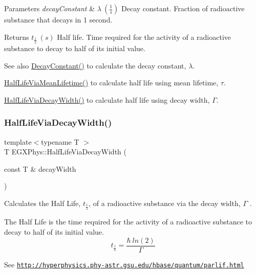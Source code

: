 \begin{DoxyParams}{Parameters}
{\em decay\+Constant} & $\lambda\ (\frac{1}{s})$ Decay constant. Fraction of radioactive substance that decays in 1 second. \\
\hline
\end{DoxyParams}
\begin{DoxyReturn}{Returns}
$t_{\frac{1}{2}}\ (s)$ Half life. Time required for the activity of a radioactive substance to decay to half of its initial value. 
\end{DoxyReturn}
\begin{DoxySeeAlso}{See also}
\hyperlink{group___atomic_ga904edce5aad441b4a0873b3b1a83c7f2}{Decay\+Constant()} to calculate the decay constant, $\lambda$. 

\hyperlink{group___half_life_gacddef16b62e98b214ec8dd8af7da7dce}{Half\+Life\+Via\+Mean\+Lifetime()} to calculate half life using mean lifetime, $\tau$. 

\hyperlink{group___half_life_gaba3fda944d1a68ee1016a1f2f5809359}{Half\+Life\+Via\+Decay\+Width()} to calculate half life using decay width, $\Gamma$. 
\end{DoxySeeAlso}
\mbox{\label{group___half_life_gaba3fda944d1a68ee1016a1f2f5809359}} 
\subsubsection{\texorpdfstring{Half\+Life\+Via\+Decay\+Width()}{HalfLifeViaDecayWidth()}}
{\footnotesize\ttfamily template$<$typename T $>$ \\
T E\+G\+X\+Phys\+::\+Half\+Life\+Via\+Decay\+Width (\begin{DoxyParamCaption}\item[{const T \&}]{decay\+Width }\end{DoxyParamCaption})}



Calculates the Half Life, $t_{\frac{1}{2}}$, of a radioactive substance via the decay width, $\Gamma$ . 

The Half Life is the time required for the activity of a radioactive substance to decay to half of its initial value. \[t_{\frac{1}{2}}=\frac{\hbar \ ln(2)}{\Gamma}\]

See \href{http://hyperphysics.phy-astr.gsu.edu/hbase/quantum/parlif.html}{\tt http\+://hyperphysics.\+phy-\/astr.\+gsu.\+edu/hbase/quantum/parlif.\+html}

